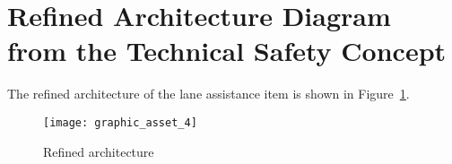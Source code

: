 \section{Refined Architecture Diagram from the Technical Safety Concept}

 

The refined architecture of the lane assistance item is shown in Figure~\ref{fig:refined-arch}.

\begin{figure}[!htbp]
\texttt{[image: graphic\_asset\_4]}
\caption{Refined architecture}
\label{fig:refined-arch}
\end{figure}

